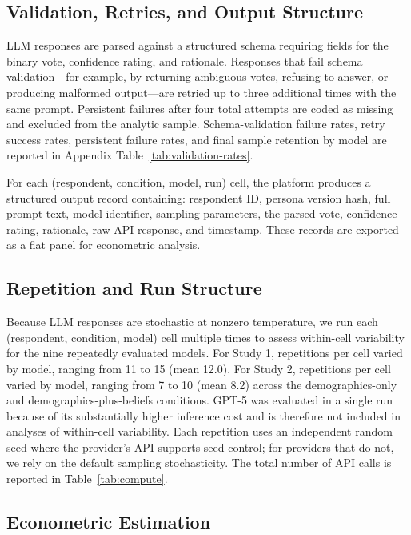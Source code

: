 \documentclass[12pt]{article}
\begin{document}
\subsection{Validation, Retries, and Output Structure}\label{sec:methods-validation}

LLM responses are parsed against a structured schema requiring fields for
the binary vote, confidence rating, and rationale. Responses that fail
schema validation---for example, by returning ambiguous votes, refusing
to answer, or producing malformed output---are retried up to three
additional times with the same prompt. Persistent failures after four
total attempts are coded as missing and excluded from the analytic sample.
Schema-validation failure rates, retry success rates, persistent failure
rates, and final sample retention by model are reported in Appendix
Table~\ref{tab:validation-rates}.

For each (respondent, condition, model, run) cell, the platform produces
a structured output record containing: respondent ID, persona version
hash, full prompt text, model identifier, sampling parameters, the parsed
vote, confidence rating, rationale, raw API response, and timestamp.
These records are exported as a flat panel for econometric analysis.

\subsection{Repetition and Run Structure}\label{sec:methods-repetition}

Because LLM responses are stochastic at nonzero temperature, we run each
(respondent, condition, model) cell multiple times to assess within-cell
variability for the nine repeatedly evaluated models. For Study 1,
repetitions per cell varied by model, ranging from 11 to 15
(mean 12.0). For Study 2, repetitions per cell varied by model, ranging
from 7 to 10 (mean 8.2) across the demographics-only and
demographics-plus-beliefs conditions. GPT-5 was evaluated in a single
run because of its substantially higher inference cost and is therefore
not included in analyses of within-cell variability. Each repetition
uses an independent random seed where the provider's API supports seed
control; for providers that do not, we rely on the default sampling
stochasticity. The total number of API calls is reported in
Table~\ref{tab:compute}.


\subsection{Econometric Estimation}\label{sec:methods-econ}
\end{document}
